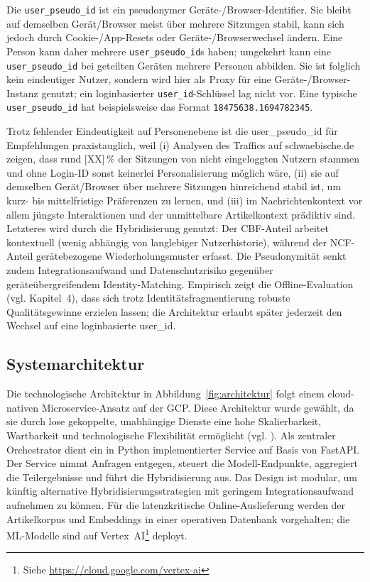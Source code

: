 Die \texttt{user\_pseudo\_id} ist ein pseudonymer Geräte-/Browser-Identifier. Sie bleibt auf demselben Gerät/Browser 
meist über mehrere Sitzungen stabil, kann sich jedoch durch Cookie-/App-Resets oder Geräte-/Browserwechsel ändern. 
Eine Person kann daher mehrere \texttt{user\_pseudo\_id}s haben; umgekehrt kann eine \texttt{user\_pseudo\_id} bei 
geteilten Geräten mehrere Personen abbilden. Sie ist folglich kein eindeutiger Nutzer, sondern wird hier als Proxy 
für eine Geräte-/Browser-Instanz genutzt; ein loginbasierter \texttt{user\_id}-Schlüssel lag nicht vor.
Eine typische \texttt{user\_pseudo\_id} hat beispielsweise das Format \texttt{18475638.1694782345}.

Trotz fehlender Eindeutigkeit auf Personenebene ist die user\_pseudo\_id für Empfehlungen praxistauglich,
weil (i) Analysen des Traffics auf schwaebische.de zeigen, dass rund [XX]\,\% 
der Sitzungen von nicht eingeloggten Nutzern stammen und
ohne Login-ID sonst keinerlei Personalisierung möglich wäre, 
(ii) sie auf demselben Gerät/Browser über mehrere Sitzungen hinreichend stabil ist, um kurz- bis mittelfristige 
Präferenzen zu lernen, und (iii) im Nachrichtenkontext vor allem jüngste Interaktionen und der unmittelbare 
Artikelkontext prädiktiv sind. Letzteres wird durch die Hybridisierung genutzt: Der CBF-Anteil arbeitet kontextuell 
(wenig abhängig von langlebiger Nutzerhistorie), während der NCF-Anteil gerätebezogene Wiederholungsmuster erfasst. 
Die Pseudonymität senkt zudem Integrationsaufwand und Datenschutzrisiko gegenüber geräteübergreifendem Identity-Matching. 
Empirisch zeigt die Offline-Evaluation (vgl. Kapitel~4), dass sich trotz Identitätsfragmentierung 
robuste Qualitätsgewinne erzielen lassen; die Architektur erlaubt später jederzeit den Wechsel auf eine 
loginbasierte user\_id.

\subsection{Systemarchitektur}
Die technologische Architektur in Abbildung~\ref{fig:architektur} folgt einem cloud-nativen Microservice-Ansatz auf der 
\ac{GCP}. Diese Architektur wurde gewählt, da sie durch lose gekoppelte, unabhängige Dienste eine hohe Skalierbarkeit, 
Wartbarkeit und technologische Flexibilität ermöglicht (vgl. \cite{Newman_Microservices_2015}). Als zentraler 
Orchestrator dient ein in Python implementierter Service auf Basis von FastAPI. Der Service nimmt Anfragen entgegen, 
steuert die Modell-Endpunkte, aggregiert die Teilergebnisse und führt die Hybridisierung aus. Das Design ist modular, 
um künftig alternative Hybridisierungsstrategien mit geringem Integrationsaufwand aufnehmen zu können. 
Für die latenzkritische Online-Auslieferung werden der Artikelkorpus und Embeddings in einer operativen 
Datenbank vorgehalten; die ML-Modelle sind auf Vertex~AI\footnote{Siehe \url{https://cloud.google.com/vertex-ai}} deployt.


